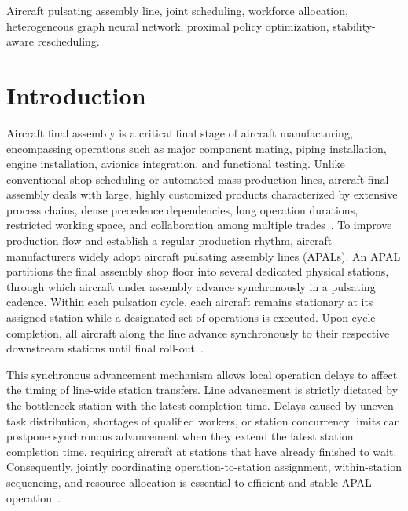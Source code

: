 \documentclass[journal,10pt]{IEEEtran}
\begin{document}
\begin{IEEEkeywords}
Aircraft pulsating assembly line, joint scheduling, workforce allocation, heterogeneous graph neural network, proximal policy optimization, stability-aware rescheduling.
\end{IEEEkeywords}

\section{Introduction}\label{sec:intro}

Aircraft final assembly is a critical final stage of aircraft manufacturing, encompassing operations such as major component mating, piping installation, engine installation, avionics integration, and functional testing. Unlike conventional shop scheduling or automated mass-production lines, aircraft final assembly deals with large, highly customized products characterized by extensive process chains, dense precedence dependencies, long operation durations, restricted working space, and collaboration among multiple trades~\cite{fang2021,bao2023,wang2024}. To improve production flow and establish a regular production rhythm, aircraft manufacturers widely adopt aircraft pulsating assembly lines (APALs). An APAL partitions the final assembly shop floor into several dedicated physical stations, through which aircraft under assembly advance synchronously in a pulsating cadence. Within each pulsation cycle, each aircraft remains stationary at its assigned station while a designated set of operations is executed. Upon cycle completion, all aircraft along the line advance synchronously to their respective downstream stations until final roll-out~\cite{lu2019}.

This synchronous advancement mechanism allows local operation delays to affect the timing of line-wide station transfers. Line advancement is strictly dictated by the bottleneck station with the latest completion time. Delays caused by uneven task distribution, shortages of qualified workers, or station concurrency limits can postpone synchronous advancement when they extend the latest station completion time, requiring aircraft at stations that have already finished to wait. Consequently, jointly coordinating operation-to-station assignment, within-station sequencing, and resource allocation is essential to efficient and stable APAL operation~\cite{becker2006,boysen2007,bao2023}.
\end{document}
